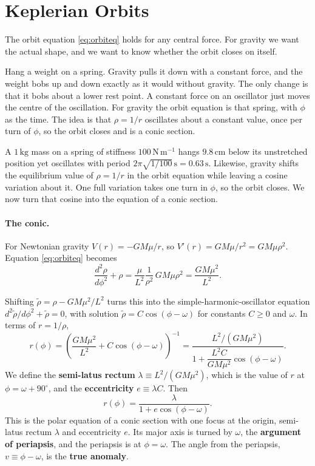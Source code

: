 	\section{Keplerian Orbits}
	\label{tb:sec:kepler_orbits}

	The orbit equation \eqref{eq:orbiteq} holds for any central force. 	For gravity we want the actual shape, and we want to know whether the orbit closes on itself.

	Hang a weight on a spring. Gravity pulls it down with a constant force, and the weight bobs up and down exactly as it would without gravity. The only change is that it bobs about a lower rest point. A constant force on an oscillator just moves the centre of the oscillation. 	For gravity the orbit equation is that spring, with $\phi$ as the time. The idea is that $\rho=1/r$ oscillates about a constant value, once per turn of $\phi$, so the orbit closes and is a conic section.

	A $1\,\mathrm{kg}$ mass on a spring of stiffness $100\,\mathrm{N\,m^{-1}}$ hangs $9.8\,\mathrm{cm}$ below its unstretched position yet oscillates with period $2\pi\sqrt{1/100}\,\mathrm s=0.63\,\mathrm s$. Likewise, gravity shifts the equilibrium value of $\rho=1/r$ in the orbit equation while leaving a cosine variation about it. One full variation takes one turn in $\phi$, so the orbit closes. We now turn that cosine into the equation of a conic section.

	\paragraph{The conic.} For Newtonian gravity $V(r)=-GM\mu/r$, so $V'(r)=GM\mu/r^2=GM\mu\rho^2$. Equation \eqref{eq:orbiteq} becomes
	\[
	\frac{d^2\rho}{d\phi^2}+\rho =\frac{\mu}{L^2}\frac{1}{\rho^2}\,GM\mu\rho^2=\frac{GM\mu^2}{L^2}.
	\]

	Shifting $\tilde\rho=\rho-GM\mu^2/L^2$ turns this into the simple-harmonic-oscillator equation $d^2\tilde\rho/d\phi^2+\tilde\rho=0$, with solution $\tilde\rho=C\cos(\phi-\omega)$ for constants $C\ge0$ and $\omega$. In terms of $r=1/\rho$,
	\[
	r(\phi)=\left(\frac{GM\mu^2}{L^2}+C\cos(\phi-\omega)\right)^{-1}
	=\frac{L^2/(GM\mu^2)}{1+\dfrac{L^2C}{GM\mu^2}\cos(\phi-\omega)}.
	\]
	We define the \textbf{semi-latus rectum} $\lambda \equiv L^2/(GM\mu^2)$, which is the value of $r$ at $\phi=\omega+90^{\circ}$, and the \textbf{eccentricity} $e\equiv \lambda C$. Then
	\begin{equation}
		\boxed{r(\phi) = \frac{\lambda}{1+e\cos(\phi-\omega)}.} \label{eq:conic}
	\end{equation}
	This is the polar equation of a conic section with one focus at the origin, semi-latus rectum $\lambda$ and eccentricity $e$. Its major axis is turned by $\omega$, the \textbf{argument of periapsis}, and the periapsis is at $\phi=\omega$. The angle from the periapsis, $v\equiv\phi-\omega$, is the \textbf{true anomaly}.

